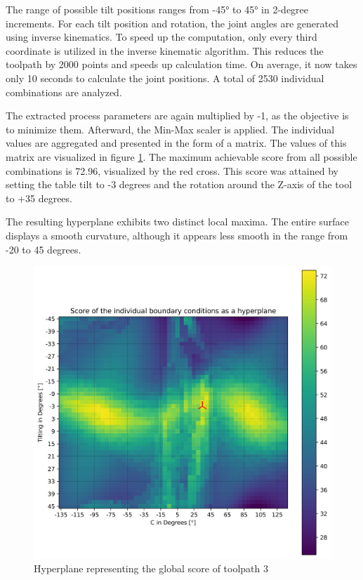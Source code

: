The range of possible tilt positions ranges from -45° to 45° in 2-degree increments. For each tilt position and rotation, the joint angles are generated using inverse kinematics. To speed up the computation, only every third coordinate is utilized in the inverse kinematic algorithm. This reduces the toolpath by 2000 points and speeds up calculation time. On average, it now takes only 10 seconds to calculate the joint positions. A total of 2530 individual combinations are analyzed.

The extracted process parameters are again multiplied by -1, as the objective is to minimize them. Afterward, the Min-Max scaler is applied. The individual values are aggregated and presented in the form of a matrix. The values of this matrix are visualized in figure \ref{best_2D}. The maximum achievable score from all possible combinations is 72.96, visualized by the red cross. This score was attained by setting the table tilt to -3 degrees and the rotation around the Z-axis of the tool to +35 degrees.

The resulting hyperplane exhibits two distinct local maxima. The entire surface displays a smooth curvature, although it appears less smooth in the range from -20 to 45 degrees.


\begin{figure}[H]
	\centerline{\includegraphics[width=1\textwidth]{figures/best_2D_3.png}}
	\caption{Hyperplane representing the global score of toolpath 3}
	\label{best_2D}
\end{figure}

